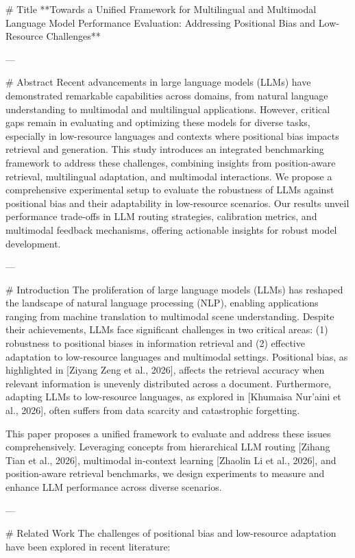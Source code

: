 # Title  
**Towards a Unified Framework for Multilingual and Multimodal Language Model Performance Evaluation: Addressing Positional Bias and Low-Resource Challenges**

---

# Abstract  
Recent advancements in large language models (LLMs) have demonstrated remarkable capabilities across domains, from natural language understanding to multimodal and multilingual applications. However, critical gaps remain in evaluating and optimizing these models for diverse tasks, especially in low-resource languages and contexts where positional bias impacts retrieval and generation. This study introduces an integrated benchmarking framework to address these challenges, combining insights from position-aware retrieval, multilingual adaptation, and multimodal interactions. We propose a comprehensive experimental setup to evaluate the robustness of LLMs against positional bias and their adaptability in low-resource scenarios. Our results unveil performance trade-offs in LLM routing strategies, calibration metrics, and multimodal feedback mechanisms, offering actionable insights for robust model development.  

---

# Introduction  
The proliferation of large language models (LLMs) has reshaped the landscape of natural language processing (NLP), enabling applications ranging from machine translation to multimodal scene understanding. Despite their achievements, LLMs face significant challenges in two critical areas: (1) robustness to positional biases in information retrieval and (2) effective adaptation to low-resource languages and multimodal settings. Positional bias, as highlighted in [Ziyang Zeng et al., 2026], affects the retrieval accuracy when relevant information is unevenly distributed across a document. Furthermore, adapting LLMs to low-resource languages, as explored in [Khumaisa Nur'aini et al., 2026], often suffers from data scarcity and catastrophic forgetting.  

This paper proposes a unified framework to evaluate and address these issues comprehensively. Leveraging concepts from hierarchical LLM routing [Zihang Tian et al., 2026], multimodal in-context learning [Zhaolin Li et al., 2026], and position-aware retrieval benchmarks, we design experiments to measure and enhance LLM performance across diverse scenarios.  

---

# Related Work  
The challenges of positional bias and low-resource adaptation have been explored in recent literature:  

